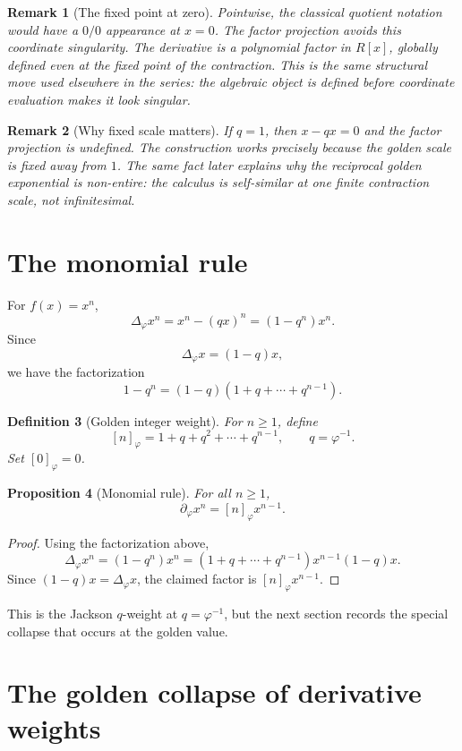 \documentclass[11pt]{article}
\newtheorem{definition}{Definition}[section]
\newtheorem{proposition}[definition]{Proposition}
\newtheorem{remark}[definition]{Remark}
\newcommand{\ph}{\varphi}
\newcommand{\dd}{\partial_{\ph}}
\newcommand{\Del}{\Delta_{\ph}}
\begin{document}
\begin{remark}[The fixed point at zero]
Pointwise, the classical quotient notation would have a $0/0$ appearance at $x=0$.  The factor projection avoids this coordinate singularity.  The derivative is a polynomial factor in $R[x]$, globally defined even at the fixed point of the contraction.  This is the same structural move used elsewhere in the series: the algebraic object is defined before coordinate evaluation makes it look singular.
\end{remark}

\begin{remark}[Why fixed scale matters]
If $q=1$, then $x-qx=0$ and the factor projection is undefined.  The construction works precisely because the golden scale is fixed away from $1$.  The same fact later explains why the reciprocal golden exponential is non-entire: the calculus is self-similar at one finite contraction scale, not infinitesimal.
\end{remark}

\section{The monomial rule}

For $f(x)=x^n$,
\[
    \Del x^n=x^n-(qx)^n=(1-q^n)x^n.
\]
Since
\[
    \Del x=(1-q)x,
\]
we have the factorization
\[
    1-q^n=(1-q)(1+q+\cdots+q^{n-1}).
\]

\begin{definition}[Golden integer weight]
For $n\ge1$, define
\[
    [n]_{\ph}=1+q+q^2+\cdots+q^{n-1},
    \qquad q=\ph^{-1}.
\]
Set $[0]_{\ph}=0$.
\end{definition}

\begin{proposition}[Monomial rule]
For all $n\ge1$,
\[
    \dd x^n=[n]_{\ph}x^{n-1}.
\]
\end{proposition}

\begin{proof}
Using the factorization above,
\[
    \Del x^n=(1-q^n)x^n
    =(1+q+\cdots+q^{n-1})x^{n-1}(1-q)x.
\]
Since $(1-q)x=\Del x$, the claimed factor is $[n]_{\ph}x^{n-1}$.
\end{proof}

This is the Jackson $q$-weight at $q=\ph^{-1}$, but the next section records the special collapse that occurs at the golden value.

\section{The golden collapse of derivative weights}
\end{document}
